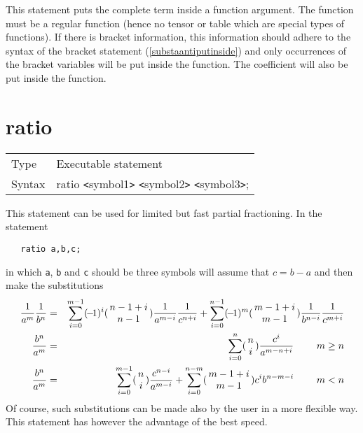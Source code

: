 \noindent This statement puts the complete term inside a 
function argument. The function must be a regular function (hence no tensor 
or table which are special types of functions). If there is 
bracket information, this information should adhere to the 
syntax of the bracket statement (\ref{substaantiputinside}) and only 
occurrences of the bracket variables will be put inside the function. The 
coefficient will also be put inside the function.
\vspace{10mm}

 
\section{ratio}
\label{substaratio}

\noindent \begin{tabular}{ll}
Type & Executable statement\\
Syntax & ratio {\tt<}symbol1{\tt>} {\tt<}symbol2{\tt>} {\tt<}symbol3{\tt>};
\end{tabular} \vspace{4mm}

\noindent This statement can be used for limited but fast 
partial fractioning. In the statement
\begin{verbatim}
   ratio a,b,c;
\end{verbatim}
in which \verb:a:, \verb:b: and \verb:c: should be three symbols {\FORM} 
will assume that $c = b-a$ and then make the substitutions
\begin{eqnarray}
    \frac{1}{a^m}\frac{1}{b^n} & = & \sum_{i=0}^{m-1}\sign(i)
        \binom(n-1+i,n-1)\frac{1}{a^{m-i}}\frac{1}{c^{n+i}}
        +\sum_{i=0}^{n-1}\sign(m)
        \binom(m-1+i,m-1)\frac{1}{b^{n-i}}\frac{1}{c^{m+i}}
        \nonumber \\
    \frac{b^n}{a^m} & = & \sum_{i=0}^n\binom(n,i)\frac{c^i}{a^{m-n+i}}
            \ \ \ \ \ \ \ \hfill m\ge n \nonumber \\
    \frac{b^n}{a^m} & = & \sum_{i=0}^{m-1}\binom(n,i)\frac{c^{n-i}}{a^{m-i}}
        + \sum_{i=0}^{n-m}\binom(m-1+i,m-1)
            c^ib^{n-m-i}
            \ \ \ \ \ \ \ \hfill m<n \nonumber
\end{eqnarray}
\setcounter{equation}{3}
Of course, such substitutions can be made also by the user in a more 
flexible way. This statement has however the advantage of the best speed.
\vspace{4mm}

